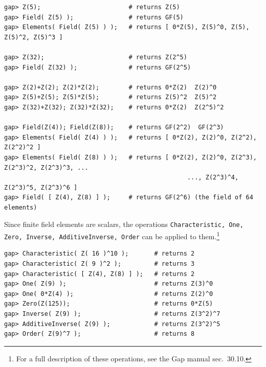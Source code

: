 \documentclass[11pt]{amsart}
\newcommand{\gap}{GAP}   %
\theoremstyle{plain}
\newcommand{\codesize}{\footnotesize}
\newcommand{\<}{\ensuremath{\langle}}
\renewcommand{\>}{\ensuremath{\rangle}}
\begin{document}
\begin{itemize}
{\begin{verbatim}
gap> Z(5);                        # returns Z(5)
gap> Field( Z(5) );               # returns GF(5)
gap> Elements( Field( Z(5) ) );   # returns [ 0*Z(5), Z(5)^0, Z(5), Z(5)^2, Z(5)^3 ]

gap> Z(32);                       # returns Z(2^5)
gap> Field( Z(32) );              # returns GF(2^5)

gap> Z(2)+Z(2); Z(2)*Z(2);        # returns 0*Z(2)  Z(2)^0
gap> Z(5)+Z(5); Z(5)*Z(5);        # returns Z(5)^2  Z(5)^2
gap> Z(32)+Z(32); Z(32)*Z(32);    # returns 0*Z(2)  Z(2^5)^2

gap> Field(Z(4)); Field(Z(8));    # returns GF(2^2)  GF(2^3)
gap> Elements( Field( Z(4) ) );   # returns [ 0*Z(2), Z(2)^0, Z(2^2), Z(2^2)^2 ]
gap> Elements( Field( Z(8) ) );   # returns [ 0*Z(2), Z(2)^0, Z(2^3), Z(2^3)^2, Z(2^3)^3, ...
                                                  ..., Z(2^3)^4, Z(2^3)^5, Z(2^3)^6 ]
gap> Field( [ Z(4), Z(8) ] );     # returns GF(2^6) (the field of 64 elements)

\end{verbatim}}
\noindent Since finite field elements are scalars, the operations 
{\tt Characteristic, One, Zero, Inverse, AdditiveInverse, Order} 
can be applied to them.\footnote{For a full description of these operations, 
see the Gap manual \cite{gapmanual} sec.~30.10.} 
{\codesize
\begin{verbatim}
gap> Characteristic( Z( 16 )^10 );       # returns 2
gap> Characteristic( Z( 9 )^2 );         # returns 3
gap> Characteristic( [ Z(4), Z(8) ] );   # returns 2
gap> One( Z(9) );                        # returns Z(3)^0
gap> One( 0*Z(4) );                      # returns Z(2)^0
gap> Zero(Z(125));                       # returns 0*Z(5)
gap> Inverse( Z(9) );                    # returns Z(3^2)^7
gap> AdditiveInverse( Z(9) );            # returns Z(3^2)^5
gap> Order( Z(9)^7 );                    # returns 8

\end{verbatim}}
\end{itemize}

\end{document}
